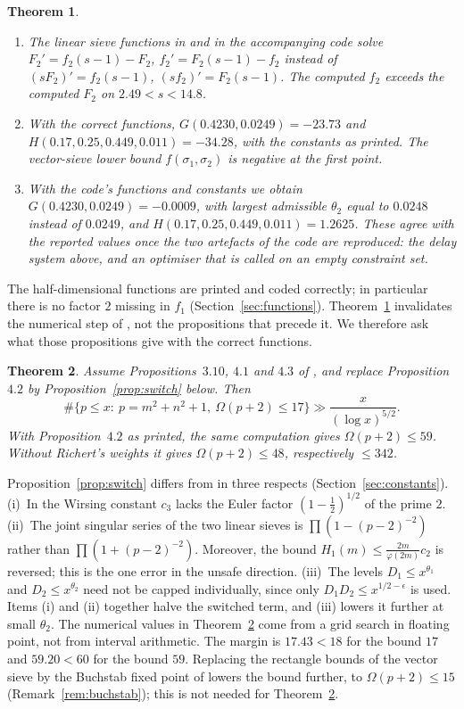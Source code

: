\documentclass[11pt,a4paper]{amsart}
\newtheorem{theorem}{Theorem}[section]
\theoremstyle{remark}
\numberwithin{equation}{section}
\begin{document}
\begin{theorem}\label{thm:A}
\begin{enumerate}
\item The linear sieve functions in \cite[\S5]{NX} and in the accompanying code solve $F_2'=f_2(s-1)-F_2$,
$f_2'=F_2(s-1)-f_2$ instead of $(sF_2)'=f_2(s-1)$, $(sf_2)'=F_2(s-1)$. The computed $f_2$ exceeds the computed $F_2$
on $2.49<s<14.8$.
\item With the correct functions, $G(0.4230,0.0249)=-23.73$ and $H(0.17,0.25,0.449,0.011)=-34.28$, with the
constants as printed. The vector-sieve lower bound $f(\sigma_1,\sigma_2)$ is negative at the first point.
\item With the code's functions and constants we obtain $G(0.4230,0.0249)=-0.0009$, with largest admissible
$\theta_2$ equal to $0.0248$ instead of $0.0249$, and $H(0.17,0.25,0.449,0.011)=1.2625$. These agree with the reported
values once the two artefacts of the code are reproduced: the delay system above, and an optimiser that is
called on an empty constraint set.
\end{enumerate}
\end{theorem}

The half-dimensional functions are printed and coded correctly; in particular there is no factor $2$ missing in
$f_1$ (Section~\ref{sec:functions}). Theorem~\ref{thm:A} invalidates the numerical step of \cite{NX}, not the
propositions that precede it. We therefore ask what those propositions give with the correct functions.

\begin{theorem}\label{thm:B}
Assume Propositions~$3.10$, $4.1$ and $4.3$ of \cite{NX}, and replace Proposition~$4.2$ by
Proposition~\ref{prop:switch} below. Then
\[
\#\{p\le x:\ p=m^2+n^2+1,\ \Omega(p+2)\le 17\}\gg\frac{x}{(\log x)^{5/2}} .
\]
With Proposition~$4.2$ as printed, the same computation gives $\Omega(p+2)\le59$. Without Richert's weights it gives
$\Omega(p+2)\le48$, respectively $\le342$.
\end{theorem}

Proposition~\ref{prop:switch} differs from \cite[Proposition~4.2]{NX} in three respects
(Section~\ref{sec:constants}). (i)~In \cite{NX} the Wirsing constant $c_3$ lacks the Euler factor $(1-\frac12)^{1/2}$ of the
prime $2$. (ii)~The joint singular series of the two linear sieves is $\prod(1-(p-2)^{-2})$ rather than
$\prod(1+(p-2)^{-2})$. Moreover, the bound $H_1(m)\le\frac{2m}{\varphi(2m)}c_2$ is reversed; this is the one error
in the unsafe direction. (iii)~The levels $D_1\le x^{\theta_1}$ and $D_2\le x^{\theta_2}$ need not be capped
individually, since only $D_1D_2\le x^{1/2-\epsilon}$ is used. Items (i) and (ii) together halve the switched term,
and (iii) lowers it further at small $\theta_2$. The numerical values in Theorem~\ref{thm:B} come from a grid
search in floating point, not from interval arithmetic. The margin is $17.43<18$ for the bound $17$ and $59.20<60$
for the bound $59$. Replacing the rectangle bounds of the vector sieve by the Buchstab fixed point of
\cite{ChenXIV} lowers the bound further, to $\Omega(p+2)\le15$ (Remark~\ref{rem:buchstab}); this is not needed for
Theorem~\ref{thm:B}.
\end{document}
